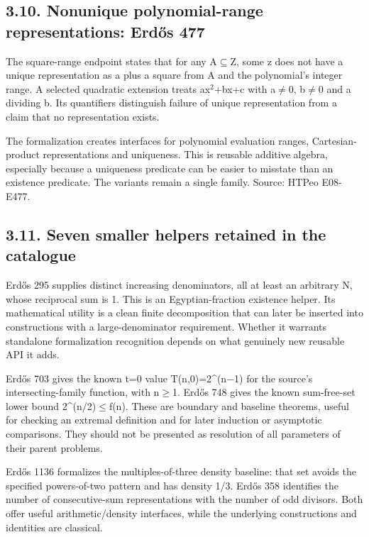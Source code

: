 \documentclass[11pt,a4paper]{article}
\begin{document}
\subsection{3.10. Nonunique polynomial-range representations: Erdős 477}
The square-range endpoint states that for any A\ensuremath{\subseteq}Z, some z does not have a unique representation as a plus a square from A and the polynomial's integer range. A selected quadratic extension treats ax\ensuremath{^2}+bx+c with a\ensuremath{\neq}0, b\ensuremath{\neq}0 and a dividing b. Its quantifiers distinguish failure of unique representation from a claim that no representation exists.

The formalization creates interfaces for polynomial evaluation ranges, Cartesian-product representations and uniqueness. This is reusable additive algebra, especially because a uniqueness predicate can be easier to misstate than an existence predicate. The variants remain a single family. Source: HTPeo E08-E477.

\subsection{3.11. Seven smaller helpers retained in the catalogue}
Erdős 295 supplies distinct increasing denominators, all at least an arbitrary N, whose reciprocal sum is 1. This is an Egyptian-fraction existence helper. Its mathematical utility is a clean finite decomposition that can later be inserted into constructions with a large-denominator requirement. Whether it warrants standalone formalization recognition depends on what genuinely new reusable API it adds.

Erdős 703 gives the known t=0 value T(n,0)=2\textasciicircum{}(n\ensuremath{-}1) for the source's intersecting-family function, with n\ensuremath{\geq}1. Erdős 748 gives the known sum-free-set lower bound 2\textasciicircum{}(n/2)\ensuremath{\leq}f(n). These are boundary and baseline theorems, useful for checking an extremal definition and for later induction or asymptotic comparisons. They should not be presented as resolution of all parameters of their parent problems.

Erdős 1136 formalizes the multiples-of-three density baseline: that set avoids the specified powers-of-two pattern and has density 1/3. Erdős 358 identifies the number of consecutive-sum representations with the number of odd divisors. Both offer useful arithmetic/density interfaces, while the underlying constructions and identities are classical.
\end{document}
